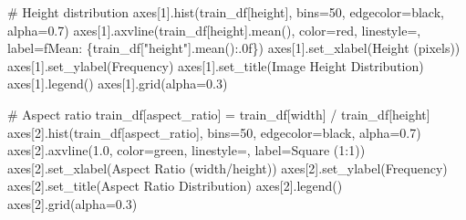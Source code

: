\documentclass[
  letterpaper,
  DIV=11,
  numbers=noendperiod]{scrartcl}
\newenvironment{Shaded}{\begin{snugshade}}{\end{snugshade}}
\newcommand{\CommentTok}[1]{\textcolor[rgb]{0.37,0.37,0.37}{#1}}
\newcommand{\DecValTok}[1]{\textcolor[rgb]{0.68,0.00,0.00}{#1}}
\newcommand{\FloatTok}[1]{\textcolor[rgb]{0.68,0.00,0.00}{#1}}
\newcommand{\NormalTok}[1]{\textcolor[rgb]{0.00,0.23,0.31}{#1}}
\newcommand{\OperatorTok}[1]{\textcolor[rgb]{0.37,0.37,0.37}{#1}}
\newcommand{\SpecialCharTok}[1]{\textcolor[rgb]{0.37,0.37,0.37}{#1}}
\newcommand{\SpecialStringTok}[1]{\textcolor[rgb]{0.13,0.47,0.30}{#1}}
\newcommand{\StringTok}[1]{\textcolor[rgb]{0.13,0.47,0.30}{#1}}
\renewenvironment{Shaded}{%
  \begin{tcolorbox}[%
    enhanced,%
    colback=codebg,%
    colframe=codebg,%
    borderline west={3pt}{0pt}{sectionblue},%
    boxrule=0pt,%
    arc=0pt,%
    boxsep=5pt,%
    left=2mm,%
    right=2mm,%
    top=2mm,%
    bottom=2mm%
  ]%
}{%
  \end{tcolorbox}%
}
\begin{document}
\begin{Shaded}
\begin{Highlighting}[]
\CommentTok{\# Height distribution}
\NormalTok{axes[}\DecValTok{1}\NormalTok{].hist(train\_df[}\StringTok{\textquotesingle{}height\textquotesingle{}}\NormalTok{], bins}\OperatorTok{=}\DecValTok{50}\NormalTok{, edgecolor}\OperatorTok{=}\StringTok{\textquotesingle{}black\textquotesingle{}}\NormalTok{, alpha}\OperatorTok{=}\FloatTok{0.7}\NormalTok{)}
\NormalTok{axes[}\DecValTok{1}\NormalTok{].axvline(train\_df[}\StringTok{\textquotesingle{}height\textquotesingle{}}\NormalTok{].mean(), color}\OperatorTok{=}\StringTok{\textquotesingle{}red\textquotesingle{}}\NormalTok{, linestyle}\OperatorTok{=}\StringTok{\textquotesingle{}{-}{-}\textquotesingle{}}\NormalTok{,}
\NormalTok{                   label}\OperatorTok{=}\SpecialStringTok{f\textquotesingle{}Mean: }\SpecialCharTok{\{}\NormalTok{train\_df[}\StringTok{"height"}\NormalTok{]}\SpecialCharTok{.}\NormalTok{mean()}\SpecialCharTok{:.0f\}}\SpecialStringTok{\textquotesingle{}}\NormalTok{)}
\NormalTok{axes[}\DecValTok{1}\NormalTok{].set\_xlabel(}\StringTok{\textquotesingle{}Height (pixels)\textquotesingle{}}\NormalTok{)}
\NormalTok{axes[}\DecValTok{1}\NormalTok{].set\_ylabel(}\StringTok{\textquotesingle{}Frequency\textquotesingle{}}\NormalTok{)}
\NormalTok{axes[}\DecValTok{1}\NormalTok{].set\_title(}\StringTok{\textquotesingle{}Image Height Distribution\textquotesingle{}}\NormalTok{)}
\NormalTok{axes[}\DecValTok{1}\NormalTok{].legend()}
\NormalTok{axes[}\DecValTok{1}\NormalTok{].grid(alpha}\OperatorTok{=}\FloatTok{0.3}\NormalTok{)}

\CommentTok{\# Aspect ratio}
\NormalTok{train\_df[}\StringTok{\textquotesingle{}aspect\_ratio\textquotesingle{}}\NormalTok{] }\OperatorTok{=}\NormalTok{ train\_df[}\StringTok{\textquotesingle{}width\textquotesingle{}}\NormalTok{] }\OperatorTok{/}\NormalTok{ train\_df[}\StringTok{\textquotesingle{}height\textquotesingle{}}\NormalTok{]}
\NormalTok{axes[}\DecValTok{2}\NormalTok{].hist(train\_df[}\StringTok{\textquotesingle{}aspect\_ratio\textquotesingle{}}\NormalTok{], bins}\OperatorTok{=}\DecValTok{50}\NormalTok{, edgecolor}\OperatorTok{=}\StringTok{\textquotesingle{}black\textquotesingle{}}\NormalTok{, alpha}\OperatorTok{=}\FloatTok{0.7}\NormalTok{)}
\NormalTok{axes[}\DecValTok{2}\NormalTok{].axvline(}\FloatTok{1.0}\NormalTok{, color}\OperatorTok{=}\StringTok{\textquotesingle{}green\textquotesingle{}}\NormalTok{, linestyle}\OperatorTok{=}\StringTok{\textquotesingle{}{-}{-}\textquotesingle{}}\NormalTok{, label}\OperatorTok{=}\StringTok{\textquotesingle{}Square (1:1)\textquotesingle{}}\NormalTok{)}
\NormalTok{axes[}\DecValTok{2}\NormalTok{].set\_xlabel(}\StringTok{\textquotesingle{}Aspect Ratio (width/height)\textquotesingle{}}\NormalTok{)}
\NormalTok{axes[}\DecValTok{2}\NormalTok{].set\_ylabel(}\StringTok{\textquotesingle{}Frequency\textquotesingle{}}\NormalTok{)}
\NormalTok{axes[}\DecValTok{2}\NormalTok{].set\_title(}\StringTok{\textquotesingle{}Aspect Ratio Distribution\textquotesingle{}}\NormalTok{)}
\NormalTok{axes[}\DecValTok{2}\NormalTok{].legend()}
\NormalTok{axes[}\DecValTok{2}\NormalTok{].grid(alpha}\OperatorTok{=}\FloatTok{0.3}\NormalTok{)}
\end{Highlighting}
\end{Shaded}
\end{document}
